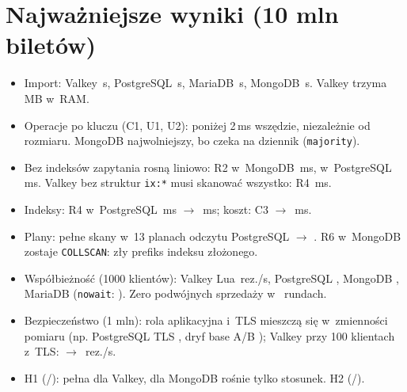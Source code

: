 \section*{Najważniejsze wyniki (10 mln biletów)}
\begin{itemize}
  \item Import: Valkey \,s, PostgreSQL \,s,
  MariaDB \,s, MongoDB \,s.
  Valkey trzyma \,MB w~RAM.
  \item Operacje po kluczu (C1, U1, U2): poniżej 2\,ms wszędzie, niezależnie od rozmiaru.
  MongoDB najwolniejszy, bo czeka na dziennik (\texttt{majority}).
  \item Bez indeksów zapytania rosną liniowo: R2 w~MongoDB \,ms,
  w~PostgreSQL \,ms. Valkey bez struktur \texttt{ix:*}
  musi skanować wszystko: R4 \,ms.
  \item Indeksy: R4 w~PostgreSQL \,ms $\to$
  \,ms; koszt: C3  $\to$
  \,ms.
  \item Plany: pełne skany w~13 planach odczytu PostgreSQL 
  $\to$ . R6 w~MongoDB zostaje \texttt{COLLSCAN}:
  zły prefiks indeksu złożonego.
  \item Współbieżność (1000 klientów): Valkey Lua \,rez./s,
  PostgreSQL , MongoDB ,
  MariaDB  (\texttt{nowait}: ).
  Zero podwójnych sprzedaży w~\ContentionRuns{} rundach.
  \item Bezpieczeństwo (1 mln): rola aplikacyjna i~TLS mieszczą się w~zmienności pomiaru
  (np. PostgreSQL TLS , dryf base A/B );
  Valkey przy 100 klientach z~TLS:  $\to$ \,rez./s.
  \item H1 \HOneVerdict{} (\HOneGrows/\HOneCases): pełna dla Valkey, dla MongoDB rośnie tylko stosunek.
  H2 \HTwoVerdict{} (\HTwoGrows/\HTwoCases).
\end{itemize}
